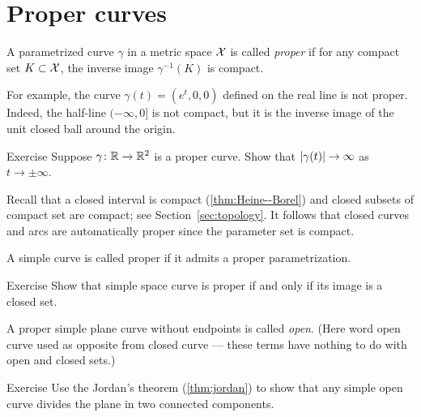 \section{Proper curves}\label{sec:proper-curves}

A parametrized curve $\gamma$ in a metric space $\mathcal{X}$ is called \emph{proper} if for any compact set $K \subset \mathcal{X}$, the inverse image $\gamma^{-1}(K)$ is compact.

For example, the curve $\gamma(t)=(e^t,0,0)$ defined on the real line is not proper.
Indeed, the half-line $(-\infty,0]$ is not compact, but it is the inverse image of the unit closed ball around the origin.

\begin{thm}{Exercise}\label{ex:open-curve}
Suppose $\gamma\colon\mathbb{R}\to\mathbb{R}^2$ is a proper curve.
Show that  $|\gamma(t)|\z\to\infty$ as $t\to\pm\infty$.
\end{thm}


Recall that a closed interval is compact (\ref{thm:Heine--Borel}) and closed subsets of compact set are compact;
see Section~\ref{sec:topology}.
It follows that closed curves and arcs are automatically proper since the parameter set is compact.

A simple curve is called proper if it admits a proper parametrization.

\begin{thm}{Exercise}\label{ex:proper-closed}
Show that simple space curve is proper if and only if its image is a closed set.

\end{thm}

A proper simple plane curve without endpoints is called \emph{open}.
(Here word open curve used as opposite from closed curve --- these terms have nothing to do with open and closed sets.)

\begin{thm}{Exercise}\label{ex:proper-curve}
Use the Jordan's theorem (\ref{thm:jordan}) to show that any simple open curve divides the plane in two connected components.  
\end{thm}



